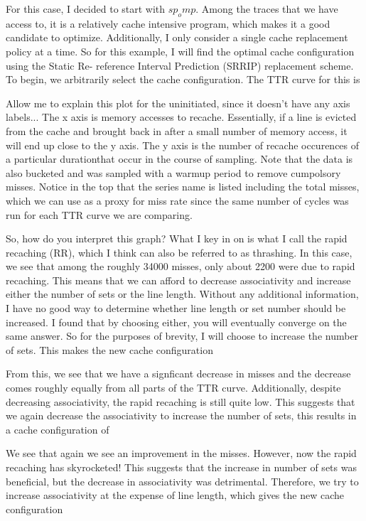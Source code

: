 For this case, I decided to start with $sp_omp$. Among the traces that we have access to, it is a relatively cache intensive program, which makes it a good candidate to optimize. Additionally, I only consider a single cache replacement policy at a time. So for this example, I will find the optimal cache configuration using the Static Re- reference Interval Prediction (SRRIP) replacement scheme. To begin, we arbitrarily select the 
cache configuration. The TTR curve for this is


Allow me to explain this plot for the uninitiated, since it doesn't have any axis labels... The x axis is memory accesses to recache. Essentially, if a line is evicted from the cache and brought back in after a small number of memory access, it will end up close to the y axis. The y axis is the number of recache occurences of a particular durationthat occur in the course of sampling. Note that the data is also bucketed and was sampled with a warmup period to remove cumpolsory misses. Notice in the top that the series name is listed including the total misses, which we can use as a proxy for miss rate since the same number of cycles was run for each TTR curve we are comparing.

So, how do you interpret this graph? What I key in on is what I call the rapid recaching (RR), which I think can also be referred to as thrashing. In this case, we see that among the roughly 34000 misses, only about 2200 were due to rapid recaching. This means that we can afford to decrease associativity and increase either the number of sets or the line length. Without any additional information, I have no good way to determine whether line length or set number should be increased. I found that by choosing either, you will eventually converge on the same answer. So for the purposes of brevity, I will choose to increase the number of sets. This makes the new cache configuration %


From this, we see that we have a signficant decrease in misses and the decrease comes roughly equally from all parts of the TTR curve. Additionally, despite decreasing associativity, the rapid recaching is still quite low. This suggests that we again decrease the associativity to increase the number of sets, this results in a cache configuration of %


We see that again we see an improvement in the misses. However, now the rapid recaching has skyrocketed! This suggests that the increase in number of sets was beneficial, but the decrease in associativity was detrimental. Therefore, we try to increase associativity at the expense of line length, which gives the new cache configuration %

